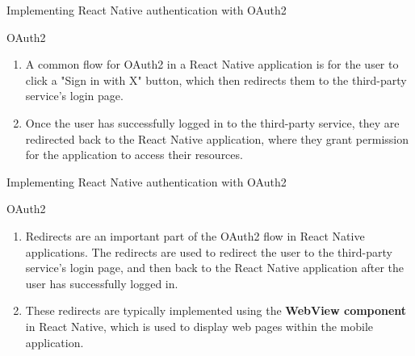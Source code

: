 \documentclass[10pt]{beamer}
\begin{document}
\begin{frame}{Implementing React Native authentication with OAuth2}
\begin{block}{OAuth2}
\begin{enumerate}
\item[\ding{230}]A common flow for OAuth2 in a React Native application is for the user to click a "Sign in with X" button, which then redirects them to the third-party service's login page.
\item[\ding{230}] Once the user has successfully logged in to the third-party service, they are redirected back to the React Native application, where they grant permission for the application to access their resources.


\end{enumerate}

\end{block}

\end{frame}

\begin{frame}{Implementing React Native authentication with OAuth2}
\begin{block}{OAuth2}
\begin{enumerate}
\item[\ding{230}] Redirects are an important part of the OAuth2 flow in React Native applications. The redirects are used to redirect the user to the third-party service's login page, and then back to the React Native application after the user has successfully logged in.
\item[\ding{230}] These redirects are typically implemented using the \textbf{WebView component}  in React Native, which is used to display web pages within the mobile application.
\end{enumerate}
\end{block}
\end{frame}
\end{document}
